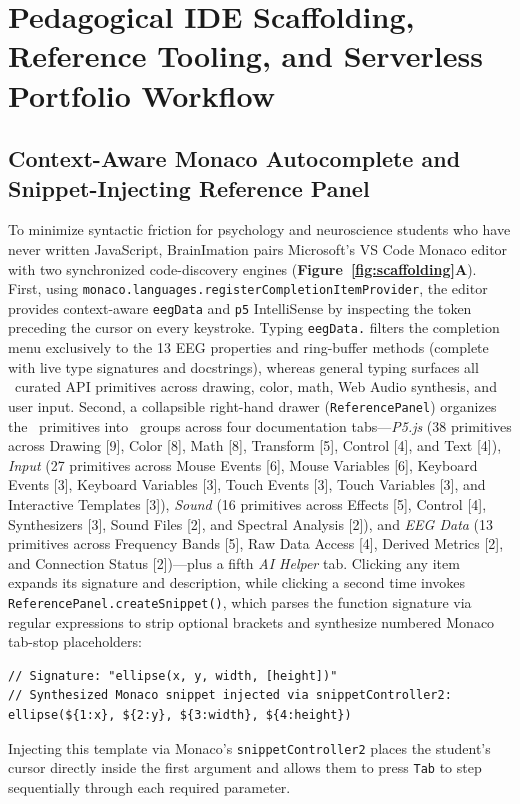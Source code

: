 \documentclass[10pt,twocolumn]{article}
\begin{document}
\section{Pedagogical IDE Scaffolding, Reference Tooling, and Serverless Portfolio Workflow}

\subsection{Context-Aware Monaco Autocomplete and Snippet-Injecting Reference Panel}
To minimize syntactic friction for psychology and neuroscience students who have never written JavaScript, BrainImation pairs Microsoft's VS Code Monaco editor with two synchronized code-discovery engines (\textbf{Figure~\ref{fig:scaffolding}A}). First, using \texttt{monaco.languages.registerCompletionItemProvider}, the editor provides context-aware \texttt{eegData} and \texttt{p5} IntelliSense by inspecting the token preceding the cursor on every keystroke. Typing \texttt{eegData.} filters the completion menu exclusively to the 13 EEG properties and ring-buffer methods (complete with live type signatures and docstrings), whereas general typing surfaces all \NRefAPIs\ curated API primitives across drawing, color, math, Web Audio synthesis, and user input. Second, a collapsible right-hand drawer (\texttt{ReferencePanel}) organizes the \NRefAPIs\ primitives into \NRefGroups\ groups across four documentation tabs---\emph{P5.js} (38 primitives across Drawing [9], Color [8], Math [8], Transform [5], Control [4], and Text [4]), \emph{Input} (27 primitives across Mouse Events [6], Mouse Variables [6], Keyboard Events [3], Keyboard Variables [3], Touch Events [3], Touch Variables [3], and Interactive Templates [3]), \emph{Sound} (16 primitives across Effects [5], Control [4], Synthesizers [3], Sound Files [2], and Spectral Analysis [2]), and \emph{EEG Data} (13 primitives across Frequency Bands [5], Raw Data Access [4], Derived Metrics [2], and Connection Status [2])---plus a fifth \emph{AI Helper} tab. Clicking any item expands its signature and description, while clicking a second time invokes \texttt{ReferencePanel.createSnippet()}, which parses the function signature via regular expressions to strip optional brackets and synthesize numbered Monaco tab-stop placeholders:
\begin{lstlisting}
// Signature: "ellipse(x, y, width, [height])"
// Synthesized Monaco snippet injected via snippetController2:
ellipse(${1:x}, ${2:y}, ${3:width}, ${4:height})
\end{lstlisting}
Injecting this template via Monaco's \texttt{snippetController2} places the student's cursor directly inside the first argument and allows them to press \texttt{Tab} to step sequentially through each required parameter.
\end{document}
